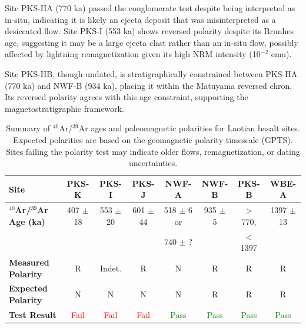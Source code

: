 \documentclass[twocolumn,11pt]{article}
\begin{document}
Site PKS-HA (770 ka) passed the conglomerate test despite being interpreted as in-situ, indicating it is likely an ejecta deposit that was misinterpreted as a desiccated flow. Site PKS-I (553 ka) shows reversed polarity despite its Brunhes age, suggesting it may be a large ejecta clast rather than an in-situ flow, possibly affected by lightning remagnetization given its high NRM intensity (10$^{-2}$ emu).

Site PKS-HB, though undated, is stratigraphically constrained between PKS-HA (770 ka) and NWF-B (934 ka), placing it within the Matuyama reversed chron. Its reversed polarity agrees with this age constraint, supporting the magnetostratigraphic framework.



\begin{table}[htbp]
    \centering
    \caption{Summary of $^{40}$Ar/$^{39}$Ar ages and paleomagnetic polarities for Laotian basalt sites. Expected polarities are based on the geomagnetic polarity timescale (GPTS). Sites failing the polarity test may indicate older flows, remagnetization, or dating uncertainties.}
    \label{tab:age_polarity_summary}
    \small
    \begin{tabular}{|l|c|c|c|c|c|c|c|}
        \hline
        \textbf{Site} & \textbf{PKS-K} & \textbf{PKS-I} & \textbf{PKS-J} & \textbf{NWF-A} & \textbf{NWF-B} & \textbf{PKS-B} & \textbf{WBE-A} \\
        \hline
        \textbf{$^{40}$Ar/$^{39}$Ar Age (ka)} & 407 $\pm$ 18 & 553 $\pm$ 20 & 601 $\pm$ 44 & 518 $\pm$ 6 or & 935 $\pm$ 5 & $>$770, & 1397 $\pm$ 13 \\
        & & & & 740 $\pm$ ? & & $<$1397 & \\
        \hline
        \textbf{Measured Polarity} & R & Indet. & R & N & R & R & R \\
        \hline
        \textbf{Expected Polarity} & N & N & N & N & R & R & R \\
        \hline
        \textbf{Test Result} & \textcolor{red}{Fail} & \textcolor{red}{Fail} & \textcolor{red}{Fail} & \textcolor{green}{Pass} & \textcolor{green}{Pass} & \textcolor{green}{Pass} & \textcolor{green}{Pass} \\
        \hline
    \end{tabular}
    \vspace{0.5em}
    

\end{table}
\end{document}
